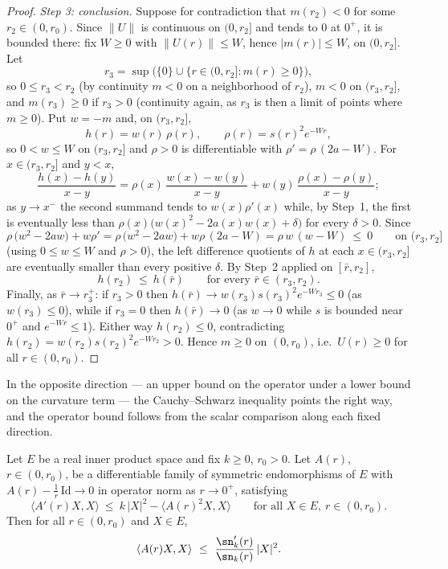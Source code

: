 \begin{proof}
\emph{Step 3: conclusion.} Suppose for contradiction that
$m(r_2)<0$ for some $r_2\in(0,r_0)$. Since $\|U\|$ is continuous
on $(0,r_2]$ and tends to $0$ at $0^+$, it is bounded there: fix
$W\ge0$ with $\|U(r)\|\le W$, hence $|m(r)|\le W$, on $(0,r_2]$.
Let
$$r_3=\sup\bigl(\{0\}\cup\{r\in(0,r_2]:m(r)\ge0\}\bigr),$$
so $0\le r_3<r_2$ (by continuity $m<0$ on a neighborhood of
$r_2$), $m<0$ on $(r_3,r_2]$, and $m(r_3)\ge0$ if $r_3>0$
(continuity again, as $r_3$ is then a limit of points where
$m\ge0$). Put $w=-m$ and, on $(r_3,r_2]$,
$$h(r)=w(r)\,\rho(r),\qquad \rho(r)=s(r)^2e^{-Wr},$$
so $0<w\le W$ on $(r_3,r_2]$ and $\rho>0$ is differentiable with
$\rho'=\rho\,(2a-W)$. For $x\in(r_3,r_2]$ and $y<x$,
$$\frac{h(x)-h(y)}{x-y}=\rho(x)\,\frac{w(x)-w(y)}{x-y}
+w(y)\,\frac{\rho(x)-\rho(y)}{x-y};$$
as $y\to x^-$ the second summand tends to $w(x)\rho'(x)$ while, by
Step~1, the first is eventually less than
$\rho(x)\bigl(w(x)^2-2a(x)w(x)+\delta\bigr)$ for every
$\delta>0$. Since
$$\rho\,\bigl(w^2-2aw\bigr)+w\rho'
=\rho\,\bigl(w^2-2aw\bigr)+w\rho\,(2a-W)
=\rho\,w\,(w-W)\ \le\ 0\qquad\text{on }(r_3,r_2]$$
(using $0\le w\le W$ and $\rho>0$), the left difference quotients
of $h$ at each $x\in(r_3,r_2]$ are eventually smaller than every
positive $\delta$. By Step~2 applied on $[\bar r,r_2]$,
$$h(r_2)\ \le\ h(\bar r)\qquad\text{for every }\bar
r\in(r_3,r_2).$$
Finally, as $\bar r\to r_3^+$: if $r_3>0$ then
$h(\bar r)\to w(r_3)s(r_3)^2e^{-Wr_3}\le0$ (as $w(r_3)\le0$),
while if $r_3=0$ then $h(\bar r)\to0$ (as $w\to0$ while $s$ is
bounded near $0^+$ and $e^{-Wr}\le1$). Either way $h(r_2)\le0$,
contradicting $h(r_2)=w(r_2)s(r_2)^2e^{-Wr_2}>0$. Hence $m\ge0$ on
$(0,r_0)$, i.e.\ $U(r)\ge0$ for all $r\in(0,r_0)$.
\end{proof}

In the opposite direction — an upper bound on the operator under a
lower bound on the curvature term — the Cauchy--Schwarz inequality
points the right way, and the operator bound follows from the scalar
comparison along each fixed direction.

\begin{lemma}
\label{lem:operator-riccati-upper}
\leanok
Let $E$ be a real inner product space and fix $k\ge0$, $r_0>0$. Let
$A(r)$, $r\in(0,r_0)$, be a differentiable family of symmetric
endomorphisms of $E$ with
$A(r)-\tfrac1r\,\mathrm{Id}\to0$ in operator norm as $r\to0^+$,
satisfying
$$\langle A'(r)X,X\rangle\ \le\ k\,|X|^2-\langle A(r)^2X,X\rangle
\qquad\text{for all }X\in E,\ r\in(0,r_0).$$
Then for all $r\in(0,r_0)$ and $X\in E$,
$$\langle A(r)X,X\rangle\ \le\
\frac{\sn_k'(r)}{\sn_k(r)}\,|X|^2 .$$
\end{lemma}

